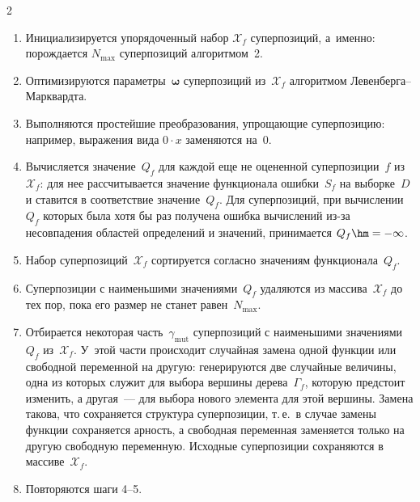 \begin{multicols}{2}
\noindent
\begin{enumerate}
  \item Инициализируется упорядоченный набор $\mathcal{X}_f$ суперпозиций,
    а~именно: порождается $N_{\max}$ суперпозиций алгоритмом~2.
  \item Оптимизируются параметры~$\boldsymbol{\omega}$ суперпозиций
    из~$\mathcal{X}_f$ алгоритмом Ле\-вен\-бер\-га--Марк\-вард\-та.
  \item Выполняются простейшие преобразования, упрощающие суперпозицию:
    например, выражения вида $0 \cdot x$ заменяются на~0.
  \item Вычисляется значение~$Q_f$ для каждой еще не оцененной суперпозиции~$f$ 
  из~$\mathcal{X}_f$: для нее рассчитывается значение функционала ошибки~$S_f$ 
  на выборке~$D$ и ставится в соответствие значение~$Q_f$. Для
    суперпозиций, при вычислении~$Q_f$ которых была хотя бы раз получена
    ошибка вычислений из-за несовпадения областей определений и значений,
    принимается $Q_f \hm= -\infty$.
  \item Набор суперпозиций~$\mathcal{X}_f$ сортируется согласно значениям
    функционала~$Q_f$.
  \item Суперпозиции с наименьшими значениями~$Q_f$ удаляются из массива~$\mathcal{X}_f$ 
  до тех пор, пока его размер не станет равен~$N_{\max}$.
  \item Отбирается некоторая часть~$\gamma_{\mathrm{mut}}$ суперпозиций с наименьшими
    значениями~$Q_f$ из~$\mathcal{X}_f$. У~этой час\-ти происходит случайная замена
    одной функции или свободной переменной на другую: генерируются две случайные величины,
    одна из которых служит для выбора вершины дерева~$\Gamma_f$, которую
    предстоит изменить, а другая~--- для выбора нового элемента для этой вершины.
    Замена такова, что сохраняется структура суперпозиции, т.\,е.\
    в случае замены функции сохраняется арность, а свободная переменная
    заменяется только на другую свободную переменную. Исходные
    суперпозиции сохраняются в массиве~$\mathcal{X}_f$.
  \item Повторяются шаги 4--5.
  
  \begin{figure} %
\vspace*{1pt}
 \begin{center}
 \mbox{%
 \epsfxsize=112.519mm
 }
 \end{center}
 \vspace*{-9pt}
  \label{fig:fitness_surph}
\end{figure}


\end{enumerate}
\end{multicols}
